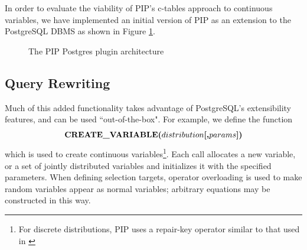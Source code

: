In order to evaluate the viability of PIP's c-tables approach to continuous variables, we have implemented an initial version of PIP as an extension to the PostgreSQL DBMS as shown in Figure \ref{fig:blockdiag}.  %

\begin{figure}
\begin{center}
\caption{The PIP Postgres plugin architecture}
\label{fig:blockdiag}
\end{center}
\vspace*{-0.3in}
\end{figure}

\subsection{Query Rewriting}
Much of this added functionality takes advantage of PostgreSQL's extensibility features, and can be used ``out-of-the-box".  For example, we define the function 
\[
\mbox{\textbf{CREATE\_VARIABLE($distribution$[,$params$])}}
\]
which is used to create continuous variables\footnote{For discrete distributions, PIP uses a repair-key operator similar to that used in \cite{KochMayBMS2008}}.  Each call allocates a new variable, or a set of jointly distributed variables and initializes it with the specified parameters.  When defining selection targets, operator overloading is used to make random variables appear as normal variables; arbitrary equations may be constructed in this way.  

